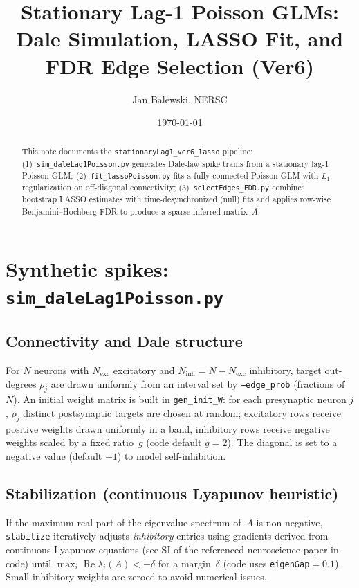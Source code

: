 \documentclass[11pt]{article}
\title{Stationary Lag-1 Poisson GLMs: Dale Simulation, LASSO Fit, and FDR Edge Selection (Ver6)}
\author{Jan Balewski, NERSC}
\date{\today}
\begin{document}
\maketitle

\begin{abstract}
This note documents the \texttt{stationaryLag1\_ver6\_lasso} pipeline: (1)~\texttt{sim\_daleLag1Poisson.py} generates Dale-law spike trains from a stationary lag-1 Poisson GLM; (2)~\texttt{fit\_lassoPoisson.py} fits a fully connected Poisson GLM with $L_1$ regularization on off-diagonal connectivity; (3)~\texttt{selectEdges\_FDR.py} combines bootstrap LASSO estimates with time-desynchronized (null) fits and applies row-wise Benjamini--Hochberg FDR to produce a sparse inferred matrix~$\widehat{A}$.
\end{abstract}

\tableofcontents
\newpage

\section{Synthetic spikes: \texttt{sim\_daleLag1Poisson.py}}
\label{sec:sim}

\subsection{Connectivity and Dale structure}

For $N$ neurons with $N_{\mathrm{exc}}$ excitatory and $N_{\mathrm{inh}}=N-N_{\mathrm{exc}}$ inhibitory, target out-degrees $\rho_j$ are drawn uniformly from an interval set by \texttt{--edge\_prob} (fractions of $N$). An initial weight matrix is built in \texttt{gen\_init\_W}: for each presynaptic neuron $j$, $\rho_j$ distinct postsynaptic targets are chosen at random; excitatory rows receive positive weights drawn uniformly in a band, inhibitory rows receive negative weights scaled by a fixed ratio~$g$ (code default $g=2$). The diagonal is set to a negative value (default $-1$) to model self-inhibition.

\subsection{Stabilization (continuous Lyapunov heuristic)}

If the maximum real part of the eigenvalue spectrum of~$A$ is non-negative, \texttt{stabilize} iteratively adjusts \emph{inhibitory} entries using gradients derived from continuous Lyapunov equations (see SI of the referenced neuroscience paper in-code) until $\max_i \operatorname{Re}\lambda_i(A) < -\delta$ for a margin~$\delta$ (code uses \texttt{eigenGap}$=0.1$). Small inhibitory weights are zeroed to avoid numerical issues.
\end{document}
